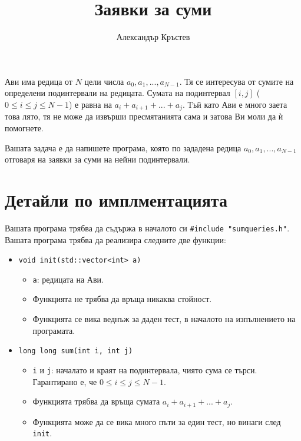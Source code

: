 \documentclass[a4paper,11pt]{article}
\title{Заявки за суми}
\author{Александър Кръстев}
\date{}
\newcommand{\code}[1]{\texttt{#1}}
\newcommand{\noskip}{\vspace{-\parskip}}
\begin{document}
{%
    \centering \LARGE 
    \textbf{\@title}
    \par
}

Ави има редица от $N$ цели числа $a_0,a_1,...,a_{N-1}$.
Тя се интересува от сумите на определени подинтервали на редицата.
Сумата на подинтервал $[i, j]$ ($0 \leq i \leq j \leq N-1$) е равна на 
$a_i + a_{i+1} + ... + a_j$.
Тъй като Ави е много заета това лято, тя не може да извърши пресмятанията сама и
затова Ви моли да ѝ помогнете.

Вашата задача е да напишете програма, която по зададена редица 
$a_0, a_1, ..., a_{N-1}$ отговаря на заявки за суми на нейни подинтервали.


\section*{Детайли по имплментацията}
Вашата програма трябва да съдържа в началото си \code{\#include "sumqueries.h"}.
\\
Вашата програма трябва да реализира следните две функции:

\noskip
\begin{itemize}
    \item \code{void init(std::vector<int> a)}
    \begin{itemize}
        \item \code{a}: редицата на Ави.
        \item Функцията не трябва да връща никаква стойност.
        \item Функцията се вика веднъж за даден тест, в началото на изпълнението
            на програмата.
    \end{itemize}
    \item \code{long long sum(int i, int j)}
    \begin{itemize}
        \item \code{i} и \code{j}: началато и краят на подинтервала, чиято сума
        се търси. Гарантирано е, че $0 \leq i \leq j \leq N-1$.
        \item Функцията трябва да връща сумата $a_i + a_{i+1} + ... + a_j$.
        \item Функцията може да се вика много пъти за един тест, но винаги след
            \code{init}.
    \end{itemize}
\end{itemize}
\end{document}
